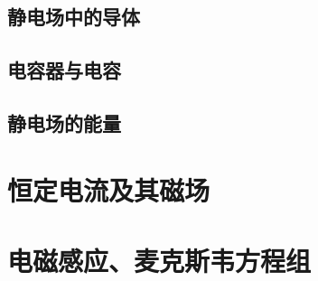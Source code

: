 \documentclass{article}
\begin{document}
    \subsection{静电场中的导体}
    \subsection{电容器与电容}
    \subsection{静电场的能量}
    \section{恒定电流及其磁场}
    \section{电磁感应、麦克斯韦方程组}
\end{document}
